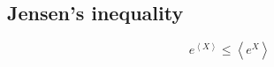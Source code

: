 \begin{appendices}
\chapter{Jensen's inequality\label{chapter:Appendix:JI}}
\begin{equation}
	e^{\left<X\right>}\leq \left<e^X\right>
\end{equation}
\end{appendices}
